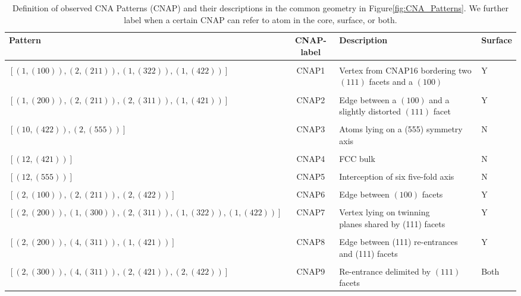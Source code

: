 \begin{table}
\caption{Definition of observed CNA Patterns (CNAP) and their descriptions in the common geometry in Figure\ref{fig:CNA_Patterns}. We further label when a certain CNAP can refer to atom in the core, surface, or both.}
\label{tab:CNA_Patterns}
\begin{tabular}{lc|ll}
\hline
Pattern   & CNAP-label                                                & Description & Surface 
\\ \hline
\\[-1em]
$[(1, (100)), (2, (211)), (1, (322)), (1, (422))]$ &  CNAP1 & \makecell{Vertex from CNAP16 bordering \\ two $(111)$ facets and a $(100)$ } & Y 
\\ \hline
\\[-1em]
%
$[(1, (200)), (2, (211)), (2, (311)), (1, (421))]$   &  CNAP2   & \makecell{Edge between a $(100)$ \\ and a slightly distorted $(111)$ facet } & Y    
\\ \hline
\\[-1em]
%
$[(10, (422)), (2, (555))]$    &  CNAP3   & Atoms lying on a (555) symmetry axis & N     
\\ \hline
\\[-1em]
%
$[(12, (421))]$   &  CNAP4   & FCC bulk & N
\\ \hline
\\[-1em]
%
$[(12, (555))]$ &  CNAP5 &  Interception of six five-fold axis & N   
\\ \hline
\\[-1em]
%
$ [(2, (100)), (2, (211)), (2, (422))] $    &  CNAP6    & Edge between $(100)$ facets & Y
\\ \hline
\\[-1em]
%
$[(2, (200)), (1, (300)), (2, (311)), (1, (322)), (1, (422))]$ &  CNAP7  & \makecell{Vertex lying on twinning \\ planes shared by (111) facets} & Y
\\ \hline
\\[-1em]
%
$[(2, (200)), (4, (311)), (1, (421))]$ &  CNAP8 & \makecell{Edge between (111) re-entrances \\ and (111) facets} & Y
\\ \hline
\\[-1em]
%
$[(2, (300)), (4, (311)), (2, (421)), (2, (422))]$ &  CNAP9 & Re-entrance delimited by $(111)$ facets & Both
\\ \hline

\end{tabular}
\end{table}
